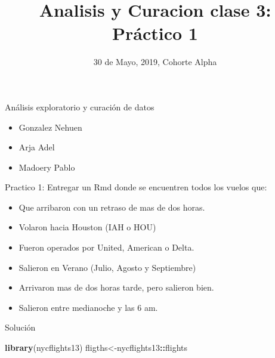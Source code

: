 \documentclass[ignorenonframetext,]{beamer}
\title{Analisis y Curacion clase 3: Práctico 1}
\date{30 de Mayo, 2019, Cohorte Alpha}
\newenvironment{Shaded}{\begin{snugshade}}{\end{snugshade}}
\newcommand{\KeywordTok}[1]{\textcolor[rgb]{0.13,0.29,0.53}{\textbf{#1}}}
\newcommand{\NormalTok}[1]{#1}
\newcommand{\OperatorTok}[1]{\textcolor[rgb]{0.81,0.36,0.00}{\textbf{#1}}}
\providecommand{\tightlist}{%
  \setlength{\itemsep}{0pt}\setlength{\parskip}{0pt}}
\begin{document}
\frame{\titlepage}

\begin{frame}{Análisis exploratorio y curación de datos}
\protect\hypertarget{analisis-exploratorio-y-curacion-de-datos}{}

\begin{itemize}
\tightlist
\item
  Gonzalez Nehuen
\item
  Arja Adel
\item
  Madoery Pablo
\end{itemize}

\end{frame}

\begin{frame}{Practico 1: Entregar un Rmd donde se encuentren todos los
vuelos que:}
\protect\hypertarget{practico-1-entregar-un-rmd-donde-se-encuentren-todos-los-vuelos-que}{}

\begin{itemize}
\tightlist
\item
  Que arribaron con un retraso de mas de dos horas.
\item
  Volaron hacia Houston (IAH o HOU)
\item
  Fueron operados por United, American o Delta.
\item
  Salieron en Verano (Julio, Agosto y Septiembre)
\item
  Arrivaron mas de dos horas tarde, pero salieron bien.
\item
  Salieron entre medianoche y las 6 am.
\end{itemize}

\end{frame}

\begin{frame}[fragile]{Solución}
\protect\hypertarget{solucion}{}

\begin{Shaded}
\begin{Highlighting}[]
\KeywordTok{library}\NormalTok{(nycflights13)}
\NormalTok{fligths<-nycflights13}\OperatorTok{::}\NormalTok{flights}
\end{Highlighting}
\end{Shaded}

\end{frame}
\end{document}
